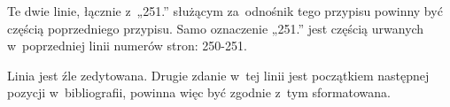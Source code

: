 \documentclass[a4paper,11pt]{article}
\begin{document}
\VerSpaceFour





\noindent
{} Te dwie linie, łącznie z~„251.” służącym za~odnośnik
tego przypisu powinny być częścią poprzedniego przypisu. Samo oznaczenie
„251.” jest częścią urwanych w~poprzedniej linii numerów stron: 250-251.

\VerSpaceFour





\noindent
{} Linia jest źle zedytowana. Drugie zdanie w~tej linii
jest początkiem następnej pozycji w~bibliografii, powinna więc być zgodnie
z~tym sformatowana.

\VerSpaceFour





\newpage

\end{document}
